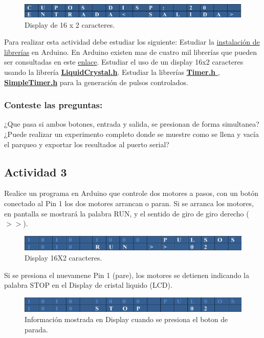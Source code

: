 \begin{figure}
	\centering
	\includegraphics[width=0.7\linewidth]{Imagenes/Dislay}
	\caption{Display de 16 x 2 caracteres.}
	\label{fig:dislay}
\end{figure}

Para realizar esta actividad debe estudiar los siguiente:
 Estudiar la \href{https://docs.arduino.cc/software/ide-v1/tutorials/installing-libraries#.Uyd116h5PRk}{instalación de librerías} en Arduino. En Arduino existen mas de cuatro mil librerías que pueden ser consultadas en este \href{https://www.arduino.cc/reference/en/libraries/}{enlace}.
 Estudiar el uso de un display 16x2 caracteres usando la librería \href{http://arduino.cc/en/Tutorial/LiquidCrystalDisplay#.UyPQYfl5OSo }{\textbf{LiquidCrystal.h}}.
 Estudiar la librerías \href{https://github.com/sstaub/Timer}{\textbf{Timer.h }}, \href{https://github.com/kiryanenko/SimpleTimer}{\textbf{SimpleTimer.h}} para la generación de pulsos controlados.
 
\subsubsection{Conteste las preguntas:}

¿Que pasa si ambos botones, entrada y salida, se presionan de forma simultanea?
¿Puede realizar un experimento completo donde se muestre como se llena y vacía el parqueo y exportar los resultados al puerto serial?

\subsection{Actividad 3}

Realice un programa en Arduino que controle dos motores a pasos, con un botón conectado al Pin 1 los dos motores arrancan o paran. Si se arranca los motores, en pantalla se mostrará la palabra RUN, y el sentido de giro  de giro derecho ($>>$).
\begin{figure}[h]
	\centering
	\includegraphics[width=0.7\linewidth]{Imagenes/Fig3}
	\caption{Display 16X2 caracteres.}
	\label{fig:fig3}
\end{figure}
Si se presiona el nuevamene Pin 1 (pare), los motores se detienen indicando la palabra STOP en el Display de cristal liquido (LCD).
\begin{figure}[H]
	\centering
	\includegraphics[width=0.7\linewidth]{Imagenes/Fig4}
	\caption{Información mostrada en Display cuando se presiona el boton de parada.}
	\label{fig:fig4}
\end{figure}

